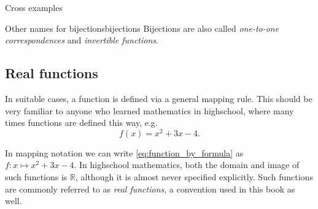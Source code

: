 \begin{example}{Cross examples}{}
\end{example}

\vspace{2em}
\begin{note}{Other names for bijections}{bijections}
	Bijections are also called \emph{one-to-one correspondences} and \emph{invertible functions}.
\end{note}

\subsection{Real functions}
In suitable cases, a function is defined via a general mapping rule. This should be very familiar to anyone who learned mathematics in highschool, where many times functions are defined this way, e.g.
\begin{equation}
	f(x) = x^{2}+3x-4.
	\label{eq:function_by_formula}
\end{equation}

In mapping notation we can write \autoref{eq:function_by_formula} as $f:x\mapsto x^{2}+3x-4$. In highschool mathematics, both the domain and image of such functions is $\mathbb{R}$, although it is almost never specified explicitly. Such functions are commonly referred to as \emph{real functions}, a convention used in this book as well.

